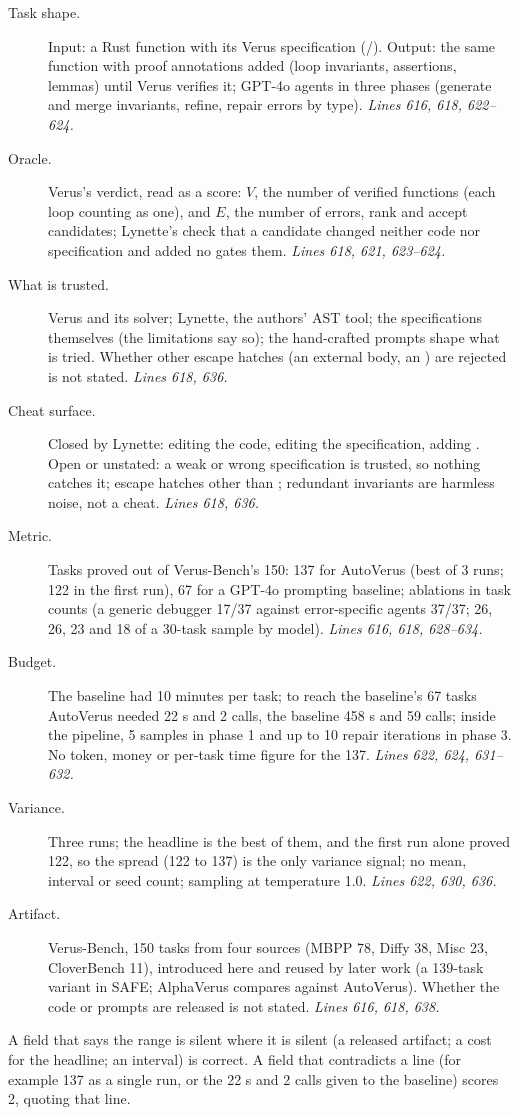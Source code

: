 \documentclass[11pt]{article}
\begin{document}
\begin{description}
\item[Task shape.] Input: a Rust function with its Verus specification
  (/). Output: the same function with proof
  annotations added (loop invariants, assertions,  lemmas) until
  Verus verifies it; GPT-4o agents in three phases (generate and merge
  invariants, refine, repair errors by type). \emph{Lines 616, 618, 622--624.}
\item[Oracle.] Verus's verdict, read as a score: $V$, the number of verified
  functions (each loop counting as one), and $E$, the number of errors, rank
  and accept candidates; Lynette's check that a candidate changed neither code
  nor specification and added no  gates them.
  \emph{Lines 618, 621, 623--624.}
\item[What is trusted.] Verus and its solver; Lynette, the authors' AST tool;
  the specifications themselves (the limitations say so); the hand-crafted
  prompts shape what is tried. Whether other escape hatches (an external body,
  an ) are rejected is not stated. \emph{Lines 618, 636.}
\item[Cheat surface.] Closed by Lynette: editing the code, editing the
  specification, adding . Open or unstated: a weak or wrong
  specification is trusted, so nothing catches it; escape hatches other than
  ; redundant invariants are harmless noise, not a cheat.
  \emph{Lines 618, 636.}
\item[Metric.] Tasks proved out of Verus-Bench's 150: 137 for AutoVerus (best
  of 3 runs; 122 in the first run), 67 for a GPT-4o prompting baseline;
  ablations in task counts (a generic debugger 17/37 against error-specific
  agents 37/37; 26, 26, 23 and 18 of a 30-task sample by model).
  \emph{Lines 616, 618, 628--634.}
\item[Budget.] The baseline had 10 minutes per task; to reach the baseline's
  67 tasks AutoVerus needed 22 s and 2 calls, the baseline 458 s and 59 calls;
  inside the pipeline, 5 samples in phase 1 and up to 10 repair iterations in
  phase 3. No token, money or per-task time figure for the 137.
  \emph{Lines 622, 624, 631--632.}
\item[Variance.] Three runs; the headline is the best of them, and the first
  run alone proved 122, so the spread (122 to 137) is the only variance
  signal; no mean, interval or seed count; sampling at temperature 1.0.
  \emph{Lines 622, 630, 636.}
\item[Artifact.] Verus-Bench, 150 tasks from four sources (MBPP 78, Diffy 38,
  Misc 23, CloverBench 11), introduced here and reused by later work (a
  139-task variant in SAFE; AlphaVerus compares against AutoVerus). Whether
  the code or prompts are released is not stated. \emph{Lines 616, 618, 638.}
\end{description}
A field that says the range is silent where it is silent (a released
artifact; a cost for the headline; an interval) is correct. A field that
contradicts a line (for example 137 as a single run, or the 22 s and 2 calls
given to the baseline) scores 2, quoting that line.
\end{document}
